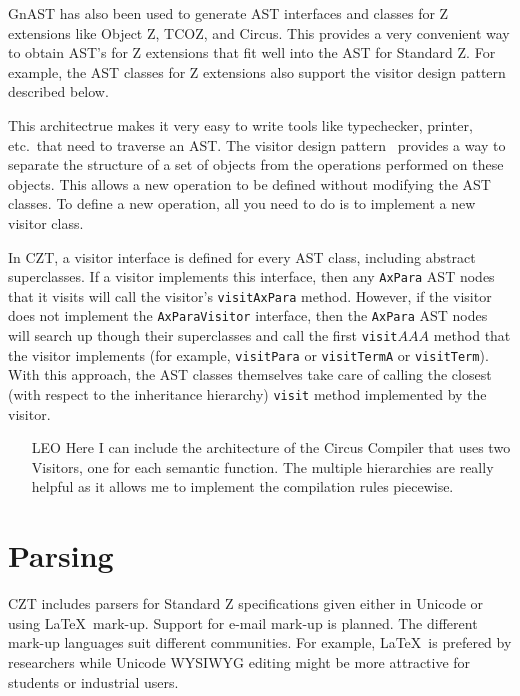\documentclass{llncs}
\newcommand{\Interface}[1]{\texttt{#1}}
\newcommand{\Method}[1]{\texttt{#1}}
\begin{document}
  GnAST has also been used to generate AST interfaces and classes for
  Z extensions like Object Z, TCOZ, and Circus.  This provides a very
  convenient way to obtain AST's for Z extensions that fit well into
  the AST for Standard Z.  For example, the AST classes for Z
  extensions also support the visitor design pattern described below.

  This architectrue makes it very easy to write tools like
  typechecker, printer, etc.\ that need to traverse an AST.  The
  visitor design pattern~\cite{GamEA:95,MaiCha:01} provides a way to
  separate the structure of a set of objects from the operations
  performed on these objects.  This allows a new operation to be
  defined without modifying the AST classes.  To define a new
  operation, all you need to do is to implement a new visitor class.

  In CZT, a visitor interface is defined for every AST class,
  including abstract superclasses.  If a visitor implements this
  interface, then any \Interface{AxPara} AST nodes that it visits will
  call the visitor's \Method{visitAxPara} method.  However, if the
  visitor does not implement the \Interface{AxParaVisitor} interface,
  then the \Interface{AxPara} AST nodes will search up though their
  superclasses and call the first \Method{visit$AAA$} method that the
  visitor implements (for example, \Interface{visitPara} or
  \Interface{visitTermA} or \Interface{visitTerm}).  With this
  approach, the AST classes themselves take care of calling the
  closest (with respect to the inheritance hierarchy) \Method{visit}
  method implemented by the visitor.

  \begin{itemize}
    \item[LEO] Here I can include the architecture of the Circus
      Compiler that uses two Visitors, one for each semantic function.
      The multiple hierarchies are really helpful as it allows me to
      implement the compilation rules piecewise.
  \end{itemize}

\section{Parsing}

  CZT includes parsers for Standard Z specifications given either in
  Unicode or using \LaTeX\ mark-up.  Support for e-mail mark-up is
  planned.  The different mark-up languages suit different
  communities.  For example, \LaTeX\ is prefered by researchers while
  Unicode WYSIWYG editing might be more attractive for students or
  industrial users.
\end{document}
